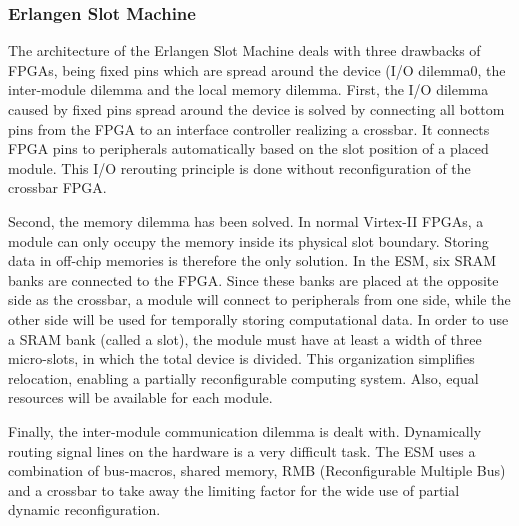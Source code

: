 \subsubsection{Erlangen Slot Machine}
The architecture of the Erlangen Slot Machine deals with three drawbacks of FPGAs, being fixed pins which are spread around the device (I/O dilemma0, the inter-module dilemma and the local memory dilemma. First, the I/O dilemma caused by fixed pins spread around the device is solved by connecting all bottom pins from the FPGA to an interface controller realizing a crossbar. It connects FPGA pins to peripherals automatically based on the slot position of a placed module. This I/O rerouting principle is done without reconfiguration of the crossbar FPGA.

Second, the memory dilemma has been solved. In normal Virtex-II FPGAs, a module can only occupy the memory inside its physical slot boundary. Storing data in off-chip memories is therefore the only solution. In the ESM, six SRAM banks are connected to the FPGA. Since these banks are placed at the opposite side as the crossbar, a module will connect to peripherals from one side, while the other side will be used for temporally storing computational data. In order to use a SRAM bank (called a slot), the module must have at least a width of three micro-slots, in which the total device is divided. This organization simplifies relocation, enabling a partially reconfigurable computing system. Also, equal resources will be available for each module.

Finally, the inter-module communication dilemma is dealt with. Dynamically routing signal lines on the hardware is a very difficult task. The ESM uses a combination of bus-macros, shared memory, RMB (Reconfigurable Multiple Bus) and a crossbar to take away the limiting factor for the wide use of partial dynamic reconfiguration.